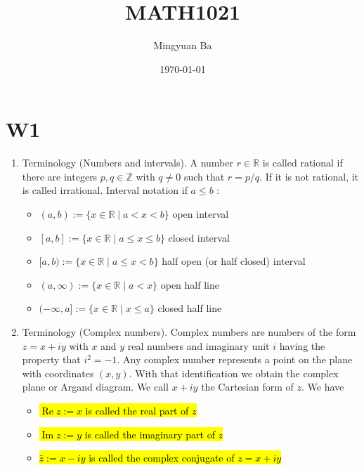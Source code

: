 \documentclass[10pt]{article}
\title{MATH1021}
\author{Mingyuan Ba}
\date{\today} %
\begin{document}
\maketitle


\section{W1}
\begin{enumerate}

\item Terminology (Numbers and intervals). A number $r \in \mathbb{R}$ is called rational if there are integers $p, q \in \mathbb{Z}$ with $q \neq 0$ such that $r=p / q$. If it is not rational, it is called irrational. Interval notation if $a \leq b$ :

\begin{itemize}
  \item $(a, b):=\{x \in \mathbb{R} \mid a<x<b\}$ open interval

  \item $[a, b]:=\{x \in \mathbb{R} \mid a \leq x \leq b\}$ closed interval

  \item $[a, b):=\{x \in \mathbb{R} \mid a \leq x<b\}$ half open (or half closed) interval

  \item $(a, \infty):=\{x \in \mathbb{R} \mid a<x\}$ open half line

  \item $(-\infty, a]:=\{x \in \mathbb{R} \mid x \leq a\}$ closed half line

\end{itemize}

\item Terminology (Complex numbers). Complex numbers are numbers of the form $z=x+i y$ with $x$ and $y$ real numbers and imaginary unit $i$ having the property that $i^{2}=-1$. Any complex number represents a point on the plane with coordinates $(x, y)$. With that identification we obtain the complex plane or Argand diagram. We call $x+i y$ the Cartesian form of $z$. We have

\begin{itemize}
  \item \hl{$\operatorname{Re} z:=x$ is called the real part of $z$}

  \item \hl{$\operatorname{Im} z:=y$ is called the imaginary part of $z$}

  \item \hl{$\bar{z}:=x-i y$ is called the complex conjugate of $z=x+i y$}


\end{itemize}
\end{enumerate}
\end{document}
